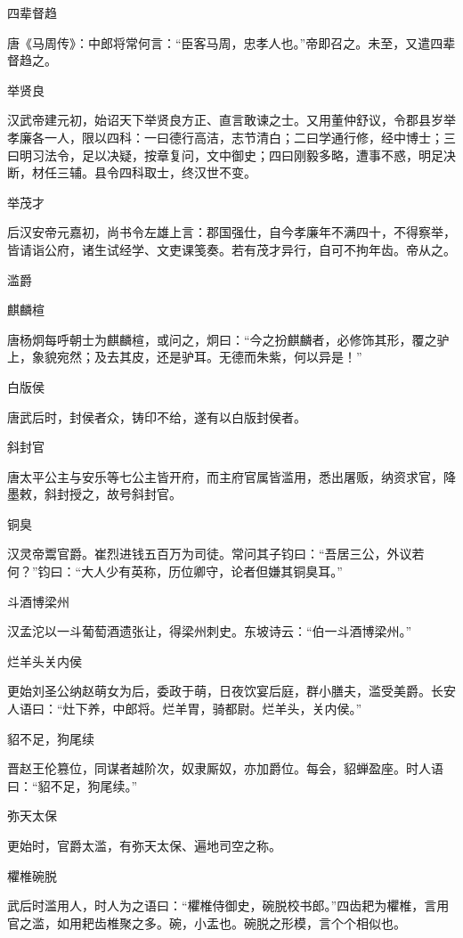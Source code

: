 \documentclass[a4paper,12pt,UTF8,twoside]{ctexbook}
\begin{document}
    四辈督趋
    
    唐《马周传》：中郎将常何言：“臣客马周，忠孝人也。”帝即召之。未至，又遣四辈督趋之。
    
    举贤良
    
    汉武帝建元初，始诏天下举贤良方正、直言敢谏之士。又用董仲舒议，令郡县岁举孝廉各一人，限以四科：一曰德行高洁，志节清白；二曰学通行修，经中博士；三曰明习法令，足以决疑，按章复问，文中御史；四曰刚毅多略，遭事不惑，明足决断，材任三辅。县令四科取士，终汉世不变。
    
    举茂才
    
    后汉安帝元嘉初，尚书令左雄上言：郡国强仕，自今孝廉年不满四十，不得察举，皆请诣公府，诸生试经学、文吏课笺奏。若有茂才异行，自可不拘年齿。帝从之。
    
    滥爵
    
    麒麟楦
    
    唐杨炯每呼朝士为麒麟楦，或问之，炯曰：“今之扮麒麟者，必修饰其形，覆之驴上，象貌宛然；及去其皮，还是驴耳。无德而朱紫，何以异是！”
    
    白版侯
    
    唐武后时，封侯者众，铸印不给，遂有以白版封侯者。
    
    斜封官
    
    唐太平公主与安乐等七公主皆开府，而主府官属皆滥用，悉出屠贩，纳资求官，降墨敕，斜封授之，故号斜封官。
    
    铜臭
    
    汉灵帝鬻官爵。崔烈进钱五百万为司徒。常问其子钧曰：“吾居三公，外议若何？”钧曰：“大人少有英称，历位卿守，论者但嫌其铜臭耳。”
    
    斗酒博梁州
    
    汉孟沱以一斗葡萄酒遗张让，得梁州刺史。东坡诗云：“伯一斗酒博梁州。”
    
    烂羊头关内侯
    
    更始刘圣公纳赵萌女为后，委政于萌，日夜饮宴后庭，群小膳夫，滥受美爵。长安人语曰：“灶下养，中郎将。烂羊胃，骑都尉。烂羊头，关内侯。”
    
    貂不足，狗尾续
    
    晋赵王伦篡位，同谋者越阶次，奴隶厮奴，亦加爵位。每会，貂蝉盈座。时人语曰：“貂不足，狗尾续。”
    
    弥天太保
    
    更始时，官爵太滥，有弥天太保、遍地司空之称。
    
    欋椎碗脱
    
    武后时滥用人，时人为之语曰：“欋椎侍御史，碗脱校书郎。”四齿耙为欋椎，言用官之滥，如用耙齿椎聚之多。碗，小盂也。碗脱之形模，言个个相似也。
    
\end{document}
